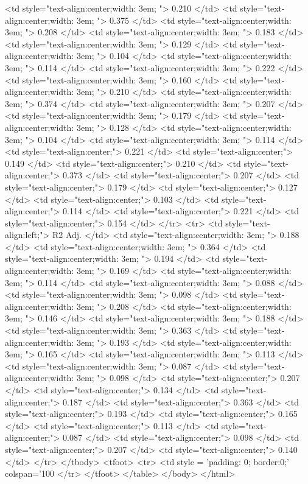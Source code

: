    <td style="text-align:center;width: 3em; "> 0.210 </td>
   <td style="text-align:center;width: 3em; "> 0.375 </td>
   <td style="text-align:center;width: 3em; "> 0.208 </td>
   <td style="text-align:center;width: 3em; "> 0.183 </td>
   <td style="text-align:center;width: 3em; "> 0.129 </td>
   <td style="text-align:center;width: 3em; "> 0.104 </td>
   <td style="text-align:center;width: 3em; "> 0.114 </td>
   <td style="text-align:center;width: 3em; "> 0.222 </td>
   <td style="text-align:center;width: 3em; "> 0.160 </td>
   <td style="text-align:center;width: 3em; "> 0.210 </td>
   <td style="text-align:center;width: 3em; "> 0.374 </td>
   <td style="text-align:center;width: 3em; "> 0.207 </td>
   <td style="text-align:center;width: 3em; "> 0.179 </td>
   <td style="text-align:center;width: 3em; "> 0.128 </td>
   <td style="text-align:center;width: 3em; "> 0.104 </td>
   <td style="text-align:center;width: 3em; "> 0.114 </td>
   <td style="text-align:center;"> 0.221 </td>
   <td style="text-align:center;"> 0.149 </td>
   <td style="text-align:center;"> 0.210 </td>
   <td style="text-align:center;"> 0.373 </td>
   <td style="text-align:center;"> 0.207 </td>
   <td style="text-align:center;"> 0.179 </td>
   <td style="text-align:center;"> 0.127 </td>
   <td style="text-align:center;"> 0.103 </td>
   <td style="text-align:center;"> 0.114 </td>
   <td style="text-align:center;"> 0.221 </td>
   <td style="text-align:center;"> 0.154 </td>
  </tr>
  <tr>
   <td style="text-align:left;"> R2 Adj. </td>
   <td style="text-align:center;width: 3em; "> 0.188 </td>
   <td style="text-align:center;width: 3em; "> 0.364 </td>
   <td style="text-align:center;width: 3em; "> 0.194 </td>
   <td style="text-align:center;width: 3em; "> 0.169 </td>
   <td style="text-align:center;width: 3em; "> 0.114 </td>
   <td style="text-align:center;width: 3em; "> 0.088 </td>
   <td style="text-align:center;width: 3em; "> 0.098 </td>
   <td style="text-align:center;width: 3em; "> 0.208 </td>
   <td style="text-align:center;width: 3em; "> 0.146 </td>
   <td style="text-align:center;width: 3em; "> 0.188 </td>
   <td style="text-align:center;width: 3em; "> 0.363 </td>
   <td style="text-align:center;width: 3em; "> 0.193 </td>
   <td style="text-align:center;width: 3em; "> 0.165 </td>
   <td style="text-align:center;width: 3em; "> 0.113 </td>
   <td style="text-align:center;width: 3em; "> 0.087 </td>
   <td style="text-align:center;width: 3em; "> 0.098 </td>
   <td style="text-align:center;"> 0.207 </td>
   <td style="text-align:center;"> 0.134 </td>
   <td style="text-align:center;"> 0.187 </td>
   <td style="text-align:center;"> 0.363 </td>
   <td style="text-align:center;"> 0.193 </td>
   <td style="text-align:center;"> 0.165 </td>
   <td style="text-align:center;"> 0.113 </td>
   <td style="text-align:center;"> 0.087 </td>
   <td style="text-align:center;"> 0.098 </td>
   <td style="text-align:center;"> 0.207 </td>
   <td style="text-align:center;"> 0.140 </td>
  </tr>
</tbody>
<tfoot>
<tr>
<td style = 'padding: 0; border:0;' colspan='100%
</tr>
</tfoot>
</table>
</body>
</html>
